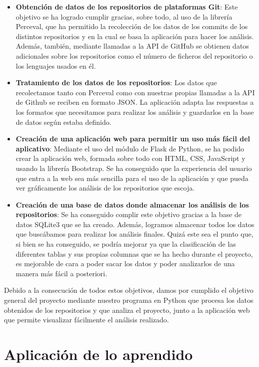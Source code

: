 \documentclass[a4paper, 12pt]{book}
\begin{document}
        \begin {itemize}
  \item \textbf {Obtención de datos de los repositorios de plataformas Git}: Este objetivo se ha logrado cumplir gracias, sobre todo, al uso de la librería Perceval, que ha permitido la recolección de los datos de los commits de los distintos repositorios y en la cual se basa la aplicación para hacer los análisis. Además, también, mediante llamadas a la API de GitHub se obtienen datos adicionales sobre los repositorios como el número de ficheros del repositorio o los lenguajes usados en él.
  \item \textbf{Tratamiento de los datos de los repositorios}: Los datos que recolectamos tanto con Perceval como con nuestras propias llamadas a la API de Github se reciben en formato JSON. La aplicación adapta las respuestas a los  formatos que necesitamos para realizar los análisis y guardarlos en la base de datos según estaba definido.
  \item \textbf{Creación de una aplicación web para permitir un uso más fácil del aplicativo}: Mediante el uso del módulo de Flask de Python, se ha podido crear la aplicación web, formada sobre todo con HTML, CSS, JavaScript y usando la librería Bootstrap. Se ha conseguido que la experiencia del usuario que entra a la web sea más sencilla para el uso de la aplicación y que pueda ver gráficamente los análisis de los repositorios que escoja.
  \item \textbf{Creación de una base de datos donde almacenar los análisis de los repositorios}: Se ha conseguido complir este objetivo gracias a la base de datos SQLite3 que se ha creado. Además, logramos almacenar todos los datos que buscábamos para realizar los análisis finales. Quizá este sea el punto que, si bien se ha conseguido, se podría mejorar ya que la clasificación de las diferentes tablas y sus propias columnas que se ha hecho durante el proyecto, es mejorable de cara a poder sacar los datos y poder analizarlos de una manera más fácil a posteriori.
\end{itemize}

Debido a la consecución de todos estos objetivos, damos por cumplido el objetivo general del proyecto mediante nuestro programa en Python que procesa los datos obtenidos de los repositorios y que analiza el proyecto, junto a la aplicación web que permite visualizar fácilmente el análisis realizado.

\section{Aplicación de lo aprendido}
\label{sec:aplicacion}
\end{document}
